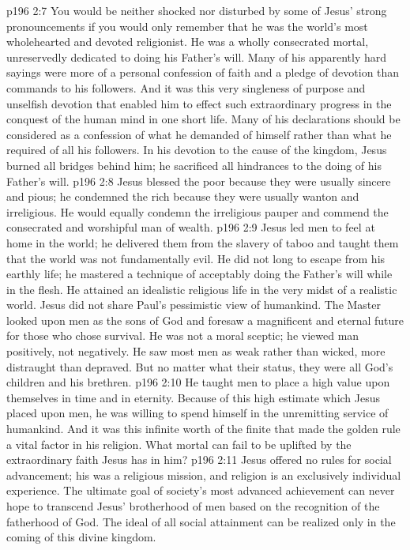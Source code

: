 \vs p196 2:7 You would be neither shocked nor disturbed by some of Jesus’ strong pronouncements if you would only remember that he was the world’s most wholehearted and devoted religionist. He was a wholly consecrated mortal, unreservedly dedicated to doing his Father’s will. Many of his apparently hard sayings were more of a personal confession of faith and a pledge of devotion than commands to his followers. And it was this very singleness of purpose and unselfish devotion that enabled him to effect such extraordinary progress in the conquest of the human mind in one short life. Many of his declarations should be considered as a confession of what he demanded of himself rather than what he required of all his followers. In his devotion to the cause of the kingdom, Jesus burned all bridges behind him; he sacrificed all hindrances to the doing of his Father’s will.
\vs p196 2:8 Jesus blessed the poor because they were usually sincere and pious; he condemned the rich because they were usually wanton and irreligious. He would equally condemn the irreligious pauper and commend the consecrated and worshipful man of wealth.
\vs p196 2:9 Jesus led men to feel at home in the world; he delivered them from the slavery of taboo and taught them that the world was not fundamentally evil. He did not long to escape from his earthly life; he mastered a technique of acceptably doing the Father’s will while in the flesh. He attained an idealistic religious life in the very midst of a realistic world. Jesus did not share Paul’s pessimistic view of humankind. The Master looked upon men as the sons of God and foresaw a magnificent and eternal future for those who chose survival. He was not a moral sceptic; he viewed man positively, not negatively. He saw most men as weak rather than wicked, more distraught than depraved. But no matter what their status, they were all God’s children and his brethren.
\vs p196 2:10 He taught men to place a high value upon themselves in time and in eternity. Because of this high estimate which Jesus placed upon men, he was willing to spend himself in the unremitting service of humankind. And it was this infinite worth of the finite that made the golden rule a vital factor in his religion. What mortal can fail to be uplifted by the extraordinary faith Jesus has in him?
\vs p196 2:11 Jesus offered no rules for social advancement; his was a religious mission, and religion is an exclusively individual experience. The ultimate goal of society’s most advanced achievement can never hope to transcend Jesus’ brotherhood of men based on the recognition of the fatherhood of God. The ideal of all social attainment can be realized only in the coming of this divine kingdom.
